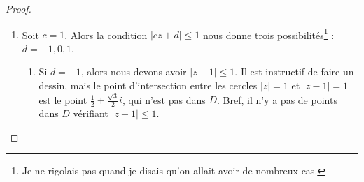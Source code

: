 \begin{proof}
\begin{subproof}
\begin{enumerate}
\begin{enumerate}
                            \item
                                Soit \( c=1\). Alors la condition \( | cz+d |\leq 1\) nous donne trois possibilités\footnote{Je ne rigolais pas quand je disais qu'on allait avoir de nombreux cas.} : \( d=-1,0,1\).

                                \begin{enumerate}
                                    \item
                                        Si \( d=-1\), alors nous devons avoir \( | z-1 |\leq 1\). Il est instructif de faire un dessin, mais le point d'intersection entre les cercles \( | z |=1\) et \( | z-1 |=1\) est le point \( \frac{ 1 }{2}+\frac{ \sqrt{3} }{2}i\), qui n'est pas dans \( D\). Bref, il n'y a pas de points dans \( D\) vérifiant \( | z-1 |\leq 1\).


\end{enumerate}
\end{enumerate}
\end{enumerate}
\end{subproof}
\end{proof}
